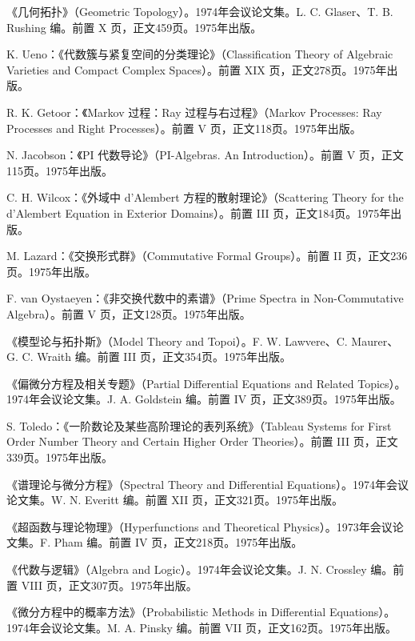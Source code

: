 \begin{description}[style=nextline,leftmargin=1.5em,itemsep=7pt]
\item[第438卷]《几何拓扑》（Geometric Topology）。1974年会议论文集。L. C. Glaser、T. B. Rushing 编。前置 X 页，正文459页。1975年出版。
\item[第439卷] K. Ueno：《代数簇与紧复空间的分类理论》（Classification Theory of Algebraic Varieties and Compact Complex Spaces）。前置 XIX 页，正文278页。1975年出版。
\item[第440卷] R. K. Getoor：《Markov 过程：Ray 过程与右过程》（Markov Processes: Ray Processes and Right Processes）。前置 V 页，正文118页。1975年出版。
\item[第441卷] N. Jacobson：《PI 代数导论》（PI-Algebras. An Introduction）。前置 V 页，正文115页。1975年出版。
\item[第442卷] C. H. Wilcox：《外域中 d'Alembert 方程的散射理论》（Scattering Theory for the d'Alembert Equation in Exterior Domains）。前置 III 页，正文184页。1975年出版。
\item[第443卷] M. Lazard：《交换形式群》（Commutative Formal Groups）。前置 II 页，正文236页。1975年出版。
\item[第444卷] F. van Oystaeyen：《非交换代数中的素谱》（Prime Spectra in Non-Commutative Algebra）。前置 V 页，正文128页。1975年出版。
\item[第445卷]《模型论与拓扑斯》（Model Theory and Topoi）。F. W. Lawvere、C. Maurer、G. C. Wraith 编。前置 III 页，正文354页。1975年出版。
\item[第446卷]《偏微分方程及相关专题》（Partial Differential Equations and Related Topics）。1974年会议论文集。J. A. Goldstein 编。前置 IV 页，正文389页。1975年出版。
\item[第447卷] S. Toledo：《一阶数论及某些高阶理论的表列系统》（Tableau Systems for First Order Number Theory and Certain Higher Order Theories）。前置 III 页，正文339页。1975年出版。
\item[第448卷]《谱理论与微分方程》（Spectral Theory and Differential Equations）。1974年会议论文集。W. N. Everitt 编。前置 XII 页，正文321页。1975年出版。
\item[第449卷]《超函数与理论物理》（Hyperfunctions and Theoretical Physics）。1973年会议论文集。F. Pham 编。前置 IV 页，正文218页。1975年出版。
\item[第450卷]《代数与逻辑》（Algebra and Logic）。1974年会议论文集。J. N. Crossley 编。前置 VIII 页，正文307页。1975年出版。
\item[第451卷]《微分方程中的概率方法》（Probabilistic Methods in Differential Equations）。1974年会议论文集。M. A. Pinsky 编。前置 VII 页，正文162页。1975年出版。

\end{description}
